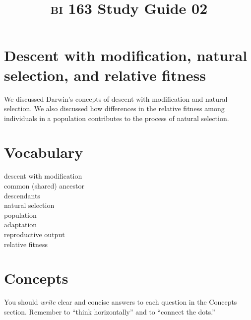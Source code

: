 \documentclass[letterpaper]{tufte-handout}
\title{{\scshape bi} 163 Study Guide 02}
\date{} %
\begin{document}
\maketitle	%

\section*{Descent with modification, natural selection, and relative fitness}

We discussed Darwin's concepts of descent with modification and natural selection. We also discussed how differences in the relative fitness among individuals in a population contributes to the process of natural selection.

\section*{Vocabulary}

\vspace{-1\baselineskip}
\begin{multicols}{2}
descent with modification\\
common (shared) ancestor \\
descendants \\
natural selection \\
population \\
adaptation \\
reproductive output \\
relative fitness
\end{multicols}

\section*{Concepts}

You should \emph{write} clear and concise answers to each question in the Concepts section.  Remember to ``think horizontally'' and to ``connect the dots.'' 
\end{document}
